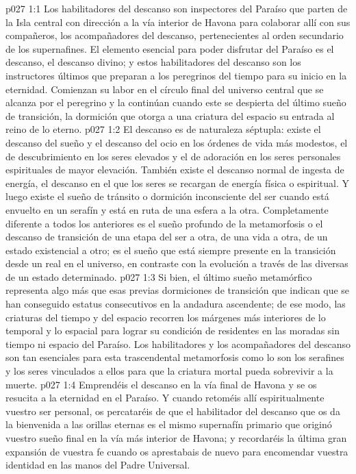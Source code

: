 \vs p027 1:1 Los habilitadores del descanso son inspectores del Paraíso que parten de la Isla central con dirección a la vía interior de Havona para colaborar allí con sus compañeros, los acompañadores del descanso, pertenecientes al orden secundario de los supernafines. El elemento esencial para poder disfrutar del Paraíso es el descanso, el descanso divino; y estos habilitadores del descanso son los instructores últimos que preparan a los peregrinos del tiempo para su inicio en la eternidad. Comienzan su labor en el círculo final del universo central que se alcanza por el peregrino y la continúan cuando este se despierta del último sueño de transición, la dormición que otorga a una criatura del espacio su entrada al reino de lo eterno.
\vs p027 1:2 \pc El descanso es de naturaleza séptupla: existe el descanso del sueño y el descanso del ocio en los órdenes de vida más modestos, el de descubrimiento en los seres elevados y el de adoración en los seres personales espirituales de mayor elevación. También existe el descanso normal de ingesta de energía, el descanso en el que los seres se recargan de energía física o espiritual. Y luego existe el sueño de tránsito o dormición inconsciente del ser cuando está envuelto en un serafín y está en ruta de una esfera a la otra. Completamente diferente a todos los anteriores es el sueño profundo de la metamorfosis o el descanso de transición de una etapa del ser a otra, de una vida a otra, de un estado existencial a otro; es el sueño que está siempre presente en la transición desde un  real en el universo, en contraste con la evolución a través de las diversas  de un estado determinado.
\vs p027 1:3 Si bien, el último sueño metamórfico representa algo más que esas previas dormiciones de transición que indican que se han conseguido estatus consecutivos en la andadura ascendente; de ese modo, las criaturas del tiempo y del espacio recorren los márgenes más interiores de lo temporal y lo espacial para lograr su condición de residentes en las moradas sin tiempo ni espacio del Paraíso. Los habilitadores y los acompañadores del descanso son tan esenciales para esta trascendental metamorfosis como lo son los serafines y los seres vinculados a ellos para que la criatura mortal pueda sobrevivir a la muerte.
\vs p027 1:4 \pc Emprendéis el descanso en la vía final de Havona y se os resucita a la eternidad en el Paraíso. Y cuando retoméis allí espiritualmente vuestro ser personal, os percataréis de que el habilitador del descanso que os da la bienvenida a las orillas eternas es el mismo supernafín primario que originó vuestro sueño final en la vía más interior de Havona; y recordaréis la última gran expansión de vuestra fe cuando os aprestabais de nuevo para encomendar vuestra identidad en las manos del Padre Universal.

